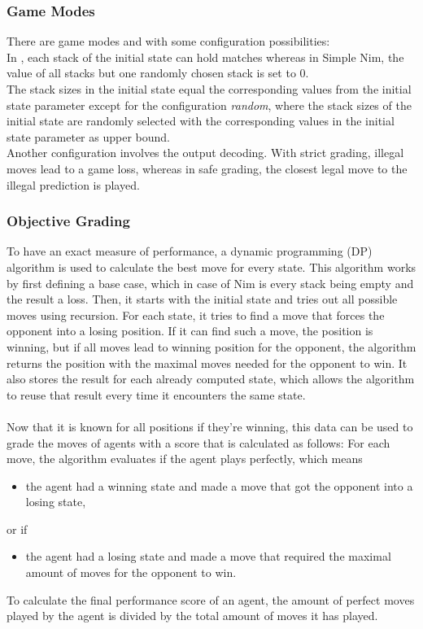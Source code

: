 \subsubsection{Game Modes}
There are game modes  and  with some configuration possibilities:
\\
In , each stack of the initial state can hold matches whereas in Simple Nim, the value of all stacks but one randomly chosen stack is set to 0.
\\
The stack sizes in the initial state equal the corresponding values from the initial state parameter except for the configuration \textit{random}, where the stack sizes of the initial state are randomly selected with the corresponding values in the initial state parameter as upper bound.
\\
Another configuration involves the output decoding.
With strict grading, illegal moves lead to a game loss, whereas in safe grading, the closest legal move to the illegal prediction is played.

\subsubsection{Objective Grading}
To have an exact measure of performance, a dynamic programming (DP) algorithm is used to calculate the best move for every state.
This algorithm works by first defining a base case, which in case of Nim is every stack being empty and the result a loss.
Then, it starts with the initial state and tries out all possible moves using recursion.
For each state, it tries to find a move that forces the opponent into a losing position.
If it can find such a move, the position is winning, but if all moves lead to winning position for the opponent, the algorithm returns the position with the maximal moves needed for the opponent to win.
It also stores the result for each already computed state, which allows the algorithm to reuse that result every time it encounters the same state.
\\ \\
Now that it is known for all positions if they're winning, this data can be used to grade the moves of agents with a score that is calculated as follows:
For each move, the algorithm evaluates if the agent plays perfectly, which means
\begin{itemize}
    \item the agent had a winning state and made a move that got the opponent into a losing state,
\end{itemize}
or if
\begin{itemize}
    \item the agent had a losing state and made a move that required the maximal amount of moves for the opponent to win.
\end{itemize}
To calculate the final performance score of an agent, the amount of perfect moves played by the agent is divided by the total amount of moves it has played.


